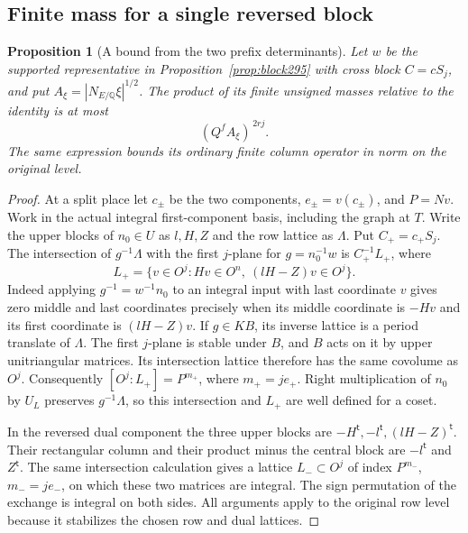 \documentclass[a4paper,11pt]{article}
\newtheorem{proposition}{Proposition}[section]
\theoremstyle{definition}
\theoremstyle{remark}
\numberwithin{equation}{section}
\begin{document}
\subsection{Finite mass for a single reversed block}\label{nav:II-66}
\begin{proposition}[A bound from the two prefix determinants]\leavevmode
\label{prop:blockfinite295}
Let \(w\) be the supported representative in
Proposition~\ref{prop:block295} with cross block
\(C=cS_j\), and put \(A_\xi=|N_{E/\mathbb Q}\xi|^{1/2}\).
The product of its finite unsigned masses relative to
the identity is at most
\[
                  (Q^f A_\xi)^{\,2rj}.
\]
The same expression bounds its ordinary finite column
operator in norm on the original level.
\end{proposition}
\begin{proof}
At a split place let \(c_\pm\) be the two components,
\(e_\pm=v(c_\pm)\), and \(P=Nv\). Work in the actual
integral first-component basis, including the graph at
\(T\). Write the upper blocks of \(n_0\in U\) as
\(l,H,Z\) and the row lattice as \(\Lambda\). Put
\(C_+=c_+S_j\). The intersection of \(g^{-1}\Lambda\)
with the first \(j\)-plane for \(g=n_0^{-1}w\) is
\(C_+^{-1}L_+\), where
\[
 L_+=\{v\in O^j: Hv\in O^n,\ (lH-Z)v\in O^j\}.
\]
Indeed applying \(g^{-1}=w^{-1}n_0\) to an integral
input with last coordinate \(v\) gives zero middle and
last coordinates precisely when its middle coordinate
is \(-Hv\) and its first coordinate is \((lH-Z)v\).
If \(g\in KB\), its inverse lattice is a period
translate of \(\Lambda\). The first \(j\)-plane is stable
under \(B\), and \(B\) acts on it by upper unitriangular
matrices. Its intersection lattice therefore has the
same covolume as \(O^j\). Consequently
\([O^j:L_+]=P^{m_+}\), where \(m_+=je_+\).
Right multiplication of \(n_0\) by \(U_L\) preserves
\(g^{-1}\Lambda\), so this intersection and \(L_+\) are
well defined for a coset.

In the reversed dual component the three upper blocks
are \(-H^{\mathsf t},-l^{\mathsf t},(lH-Z)^{\mathsf t}\).
Their rectangular column and their product minus the
central block are \(-l^{\mathsf t}\) and \(Z^{\mathsf t}\).
The same intersection calculation gives a lattice
\(L_-\subset O^j\) of index \(P^{m_-}\), \(m_-=je_-\),
on which these two matrices are integral. The sign
permutation of the exchange is integral on both sides.
All arguments apply to the original row level because
it stabilizes the chosen row and dual lattices.


\end{proof}
\end{document}
